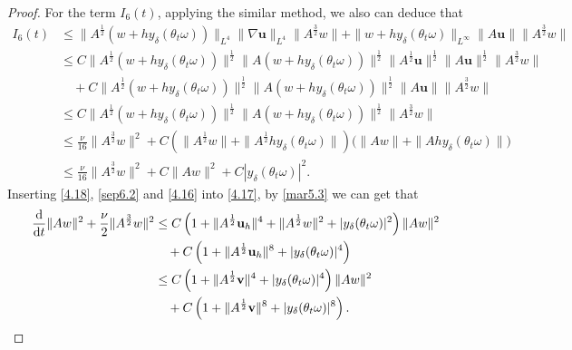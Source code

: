 \documentclass{elsarticle}
\theoremstyle{definition}
\numberwithin{equation}{section}
\renewcommand{\d}{{\rm{d}}}
\begin{document}
\begin{proof}
For the term $I_{6}(t)$, applying the similar method, we also can deduce that
\begin{align}\label{4.16}
I_{6}(t)&\leq\|A^{\frac12}(w+hy_\delta(\theta_t\omega))\|_{L^4}\|\nabla \textbf{u}\|_{L^4}\|A^\frac32w\|+\|w+hy_\delta(\theta_t\omega)\|_{L^\infty}\|A\textbf{u}\|\|A^\frac32w\|\nonumber\\
&\leq C\|A^{\frac12}(w+hy_\delta(\theta_t\omega))\|^\frac12\|A(w+hy_\delta(\theta_t\omega))\|^\frac12\|A^\frac12\textbf{u}\|^\frac12
\|A\textbf{u}\|^\frac12\|A^\frac32w\|\nonumber\\
& \quad +C\|A^\frac12(w+hy_\delta(\theta_t\omega))\|^\frac12\|A(w+hy_\delta(\theta_t\omega))\|^\frac12\|A\textbf{u}\|\|A^\frac32w\|\nonumber\\
&\leq C\|A^{\frac12}(w+hy_\delta(\theta_t\omega))\|^\frac12\|A(w+hy_\delta(\theta_t\omega))\|^\frac12\|A^\frac32w\|\nonumber\\
&\leq \frac \nu {16}\|A^\frac32w\|^2+C\left(\|A^{\frac12}w\|+\|A^{\frac12}hy_\delta(\theta_t\omega)\| \right) \big (\|Aw\|
+\|Ahy_\delta(\theta_t\omega)\| \big )\nonumber\\
&\leq \frac \nu {16}\|A^\frac32w\|^2+C\|Aw\|^2 +C |y_\delta(\theta_t\omega)|^2.
\end{align}
Inserting \eqref{4.18}, \eqref{sep6.2} and \eqref{4.16} into \eqref{4.17}, by \eqref{mar5.3}  we can get that
\begin{align}
 \frac{\d}{\d t}\|Aw\|^2+  \frac{\nu}{2}  \|A^{\frac32}w\|^2
&\leq C\left (1+\|A^\frac12\textbf{u}_h\|^4+\|A^\frac12w\|^2+|y_\delta(\theta_t\omega)|^2 \right )
\|Aw\|^2\nonumber\\
&\quad +C \left (1+\|A^\frac12\textbf{u}_h\|^8+|y_\delta(\theta_t\omega)|^4 \right) \nonumber \\
 &\leq C\left (1+\|A^\frac12 \textbf{v}\|^4 +|y_\delta(\theta_t\omega)|^4 \right )
\|Aw\|^2  \nonumber \\
&\quad +C \left (1+\|A^\frac12 \textbf{v}\|^8 +|y_\delta(\theta_t\omega)|^8 \right) .  \label{sep6.3}
\end{align}


\end{proof}
\end{document}
